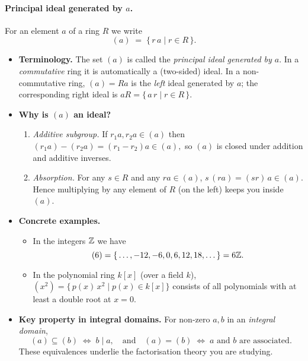 \documentclass[12pt]{article}
\theoremstyle{definition} %
\theoremstyle{plain} %
\begin{document}
\paragraph{Principal ideal generated by \(a\).}
For an element \(a\) of a ring \(R\) we write
\[
  (a)\;=\;\{\,r\,a \mid r\in R\,\}.
\]

\begin{itemize}
  \item \textbf{Terminology.}  
        The set \((a)\) is called the \emph{principal ideal generated by \(a\)}.
        In a \emph{commutative} ring it is automatically a (two-sided) ideal.
        In a non-commutative ring, \((a)=Ra\) is the \emph{left} ideal generated by \(a\);
        the corresponding right ideal is \(aR=\{\,a\,r \mid r\in R\,\}\).

  \item \textbf{Why is \((a)\) an ideal?}  
        \begin{enumerate}
          \item \emph{Additive subgroup.}  
                If \(r_1a,r_2a\in (a)\) then
                \(
                   (r_1a)-(r_2a) = (r_1-r_2)a \in (a),
                \)
                so \((a)\) is closed under addition and additive inverses.
          \item \emph{Absorption.}  
                For any \(s\in R\) and any \(ra\in(a)\),
                \(
                   s\,(ra) = (sr)\,a \in (a).
                \)
                Hence multiplying by any element of \(R\) (on the left) keeps you inside \((a)\).
        \end{enumerate}

  \item \textbf{Concrete examples.}
        \begin{itemize}
          \item In the integers \(\Bbb Z\) we have
                \[
                  (6) = \{\,\dots,-12,-6,0,6,12,18,\dots\} 
                       = 6\Bbb Z .
                \]
          \item In the polynomial ring \(k[x]\) (over a field \(k\)),
                \(
                  (x^2) = \{\,p(x)\,x^2 \mid p(x)\in k[x]\}
                \)
                consists of all polynomials with at least a double root at \(x=0\).
        \end{itemize}

  \item \textbf{Key property in integral domains.}  
        For non-zero \(a,b\) in an \emph{integral domain},
        \[
           (a)\subseteq(b) \;\Longleftrightarrow\; b\mid a,
           \quad\text{and}\quad
           (a)=(b) \;\Longleftrightarrow\; a \text{ and } b \text{ are associated}.
        \]
        These equivalences underlie the factorisation theory you are studying.
\end{itemize}
\end{document}
